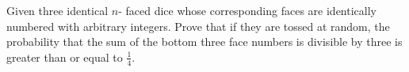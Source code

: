 Given three identical $n$- faced dice whose corresponding faces are identically numbered with arbitrary integers.  Prove that if they are tossed at random, the probability that the sum of the bottom three face numbers is divisible by three is greater than or equal to $\frac{1}{4}$.